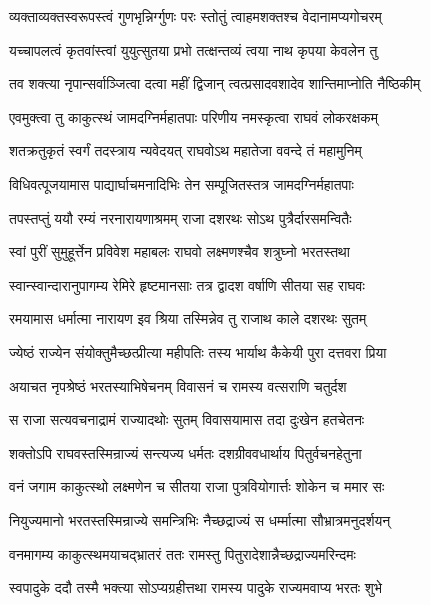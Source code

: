 \twolineshloka
{व्यक्ताव्यक्तस्वरूपस्त्वं गुणभृन्निर्ग्गुणः परः}
{स्तोतुं त्वाहमशक्तश्च वेदानामप्यगोचरम्}%

\twolineshloka
{यच्चापलत्वं कृतवांस्त्वां युयुत्सुतया प्रभो}
{तत्क्षन्तव्यं त्वया नाथ कृपया केवलेन तु}%

\twolineshloka
{तव शक्त्या नृपान्सर्वाञ्जित्वा दत्वा महीं द्विजान्}
{त्वत्प्रसादवशादेव शान्तिमाप्नोति नैष्ठिकीम्}%


\twolineshloka
{एवमुक्त्वा तु काकुत्स्थं जामदग्निर्महातपाः}
{परिणीय नमस्कृत्वा राघवं लोकरक्षकम्}%

\twolineshloka
{शतक्रतुकृतं स्वर्गं तदस्त्राय न्यवेदयत्}
{राघवोऽथ महातेजा ववन्दे तं महामुनिम्}%

\twolineshloka
{विधिवत्पूजयामास पाद्यार्घाचमनादिभिः}
{तेन सम्पूजितस्तत्र जामदग्निर्महातपाः}%

\twolineshloka
{तपस्तप्तुं ययौ रम्यं नरनारायणाश्रमम्}
{राजा दशरथः सोऽथ पुत्रैर्दारसमन्वितैः}%

\twolineshloka
{स्वां पुरीं सुमुहूर्त्तेन प्रविवेश महाबलः}
{राघवो लक्ष्मणश्चैव शत्रुघ्नो भरतस्तथा}%

\twolineshloka
{स्वान्स्वान्दारानुपागम्य रेमिरे हृष्टमानसाः}
{तत्र द्वादश वर्षाणि सीतया सह राघवः}%

\twolineshloka
{रमयामास धर्मात्मा नारायण इव श्रिया}
{तस्मिन्नेव तु राजाथ काले दशरथः सुतम्}%

\twolineshloka
{ज्येष्ठं राज्येन संयोक्तुमैच्छत्प्रीत्या महीपतिः}
{तस्य भार्याथ कैकेयी पुरा दत्तवरा प्रिया}%

\twolineshloka
{अयाचत नृपश्रेष्ठं भरतस्याभिषेचनम्}
{विवासनं च रामस्य वत्सराणि चतुर्दश}%

\twolineshloka
{स राजा सत्यवचनाद्रामं राज्यादथोः सुतम्}
{विवासयामास तदा दुःखेन हतचेतनः}%

\twolineshloka
{शक्तोऽपि राघवस्तस्मिन्राज्यं सन्त्यज्य धर्मतः}
{दशग्रीववधार्थाय पितुर्वचनहेतुना}%

\twolineshloka
{वनं जगाम काकुत्स्थो लक्ष्मणेन च सीतया}
{राजा पुत्रवियोगार्त्तः शोकेन च ममार सः}%

\twolineshloka
{नियुज्यमानो भरतस्तस्मिन्राज्ये समन्त्रिभिः}
{नैच्छद्राज्यं स धर्म्मात्मा सौभ्रात्रमनुदर्शयन्}%

\twolineshloka
{वनमागम्य काकुत्स्थमयाचद्भ्रातरं ततः}
{रामस्तु पितुरादेशान्नैच्छद्राज्यमरिन्दमः}%

\twolineshloka
{स्वपादुके ददौ तस्मै भक्त्या सोऽप्यग्रहीत्तथा}
{रामस्य पादुके राज्यमवाप्य भरतः शुभे}%

